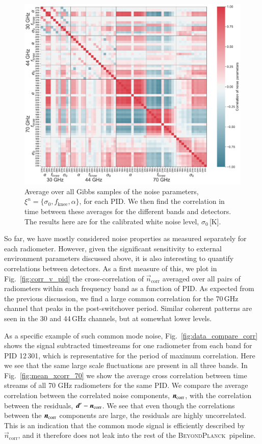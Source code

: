 \documentclass[twocolumn]{aa}
\renewcommand{\d}[0]{\vec{d}}
\newcommand{\n}[0]{\vec{n}}
\newcommand{\BP}{\textsc{BeyondPlanck}}
\begin{document}
\begin{figure}
	\begin{center}
		\includegraphics[width=1.0\linewidth]{figs/noise_parameter_correlation.pdf}
	\end{center}
	\caption{Average over all Gibbs samples of the noise parameters, $\xi^n = \{\sigma_0, f_\mathrm{knee}, \alpha\}$,  for each PID. We then find the correlation in time between these averages for the different bands and detectors. The results here are for the calibrated white noise level, $\sigma_0$\,[K].
		\label{fig:xi_corr}}
\end{figure}

So far, we have mostly considered noise properties as measured
separately for each radiometer. However, given the significant
sensitivity to external environment parameters discussed above, it is
also interesting to quantify correlations between detectors. As a
first measure of this, we plot in Fig.~\ref{fig:corr_v_pid} the
cross-correlation of $\n_{\mathrm{corr}}$ averaged over all pairs of
radiometers within each frequency band as a function of PID. As
expected from the previous discussion, we find a large common
correlation for the 70\,GHz channel that peaks in the post-switchover
period. Similar coherent patterns are seen in the 30 and 44\,GHz
channels, but at somewhat lower levels.

As a specific example of such common mode noise,
Fig.~\ref{fig:data_compare_corr} shows the signal subtracted
timestreams for one radiometer from each band for PID 12\,301, which
is representative for the period of maximum correlation. Here we
see that the same large scale fluctuations are present in all
three bands. In Fig.~\ref{fig:mean_xcorr_70} we show the average cross
correlation between time streams of all 70 GHz radiometers for the
same PID. We compare the average correlation between the correlated
noise components, $\n_{\rm corr}$, with the correlation between the
residuals, $\d'-\n_{\rm corr}$. We see that even though the
correlations between the $\n_{\rm corr}$ components are large, the
residuals are highly uncorrelated. This is an indication that the
common mode signal is efficiently described by $\n_{\mathrm{corr}}$,
and it therefore does not leak into the rest of the \BP\ pipeline.
\end{document}
